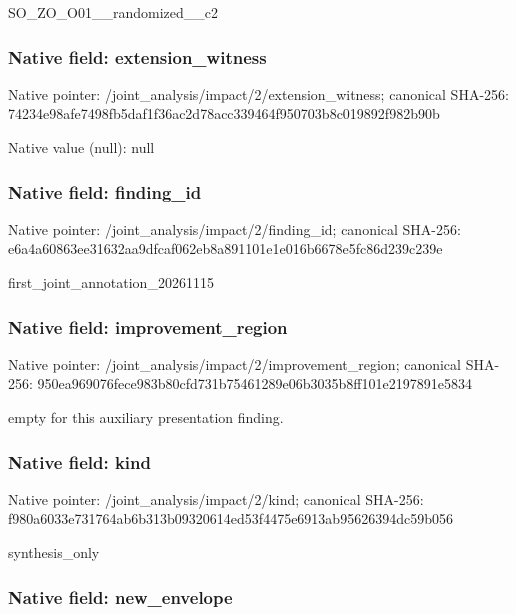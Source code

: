\documentclass[10pt,a4paper]{article}
\begin{document}
SO\_ZO\_O01\_\_randomized\_\_c2


\subsubsection{Native field: extension\_witness}


Native pointer: /joint\_analysis/impact/2\allowbreak{}/extension\_witness; canonical SHA-256: 74234e98afe7498fb5daf1f3\allowbreak{}6ac2d78acc339464f950703b\allowbreak{}8c019892f982b90b



Native value (null): null



\subsubsection{Native field: finding\_id}


Native pointer: /joint\_analysis/impact/2/finding\_id; canonical SHA-256: e6a4a60863ee31632aa9dfca\allowbreak{}f062eb8a891101e1e016b667\allowbreak{}8e5fc86d239c239e


first\_joint\_annotation\_20261115


\subsubsection{Native field: improvement\_region}


Native pointer: /joint\_analysis/impact/2\allowbreak{}/improvement\_region; canonical SHA-256: 950ea969076fece983b80cfd\allowbreak{}731b75461289e06b3035b8ff\allowbreak{}101e2197891e5834


empty for this auxiliary presentation finding.


\subsubsection{Native field: kind}


Native pointer: /joint\_analysis/impact/2/kind; canonical SHA-256: f980a6033e731764ab6b313b\allowbreak{}09320614ed53f4475e6913ab\allowbreak{}95626394dc59b056


synthesis\_only


\subsubsection{Native field: new\_envelope}
\end{document}
